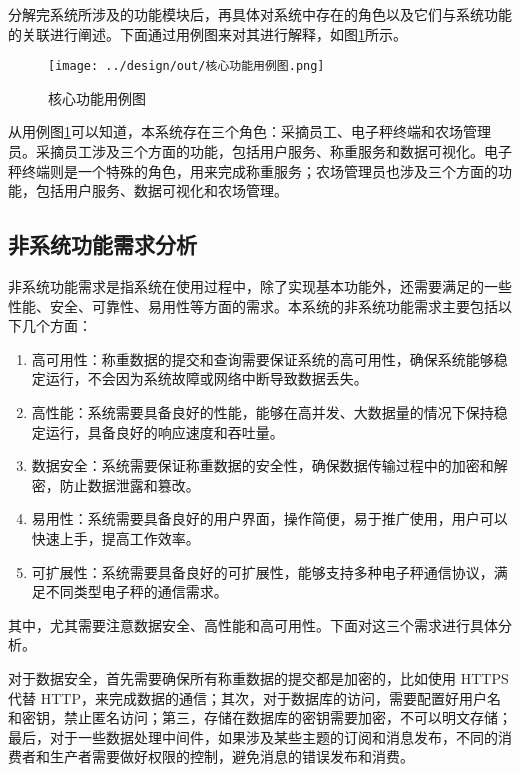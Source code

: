 分解完系统所涉及的功能模块后，再具体对系统中存在的角色以及它们与系统功能的关联进行阐述。下面通过用例图来对其进行解释，如图\ref{fig:核心功能用例图}所示。

\begin{figure}[H]
    \centering
    \texttt{[image: ../design/out/核心功能用例图.png]}
    \caption{核心功能用例图}
    \label{fig:核心功能用例图}
\end{figure}

从用例图\ref{fig:核心功能用例图}可以知道，本系统存在三个角色：采摘员工、电子秤终端和农场管理员。采摘员工涉及三个方面的功能，包括用户服务、称重服务和数据可视化。电子秤终端则是一个特殊的角色，用来完成称重服务；农场管理员也涉及三个方面的功能，包括用户服务、数据可视化和农场管理。

\subsection{非系统功能需求分析}

非系统功能需求是指系统在使用过程中，除了实现基本功能外，还需要满足的一些性能、安全、可靠性、易用性等方面的需求。本系统的非系统功能需求主要包括以下几个方面：

\begin{enumerate}
    \item 高可用性：称重数据的提交和查询需要保证系统的高可用性，确保系统能够稳定运行，不会因为系统故障或网络中断导致数据丢失。
    \item 高性能：系统需要具备良好的性能，能够在高并发、大数据量的情况下保持稳定运行，具备良好的响应速度和吞吐量。
    \item 数据安全：系统需要保证称重数据的安全性，确保数据传输过程中的加密和解密，防止数据泄露和篡改。
    \item 易用性：系统需要具备良好的用户界面，操作简便，易于推广使用，用户可以快速上手，提高工作效率。
    \item 可扩展性：系统需要具备良好的可扩展性，能够支持多种电子秤通信协议，满足不同类型电子秤的通信需求。
\end{enumerate}

其中，尤其需要注意数据安全、高性能和高可用性。下面对这三个需求进行具体分析。

对于数据安全，首先需要确保所有称重数据的提交都是加密的，比如使用 HTTPS 代替 HTTP，来完成数据的通信；其次，对于数据库的访问，需要配置好用户名和密钥，禁止匿名访问；第三，存储在数据库的密钥需要加密，不可以明文存储；最后，对于一些数据处理中间件，如果涉及某些主题的订阅和消息发布，不同的消费者和生产者需要做好权限的控制，避免消息的错误发布和消费。

